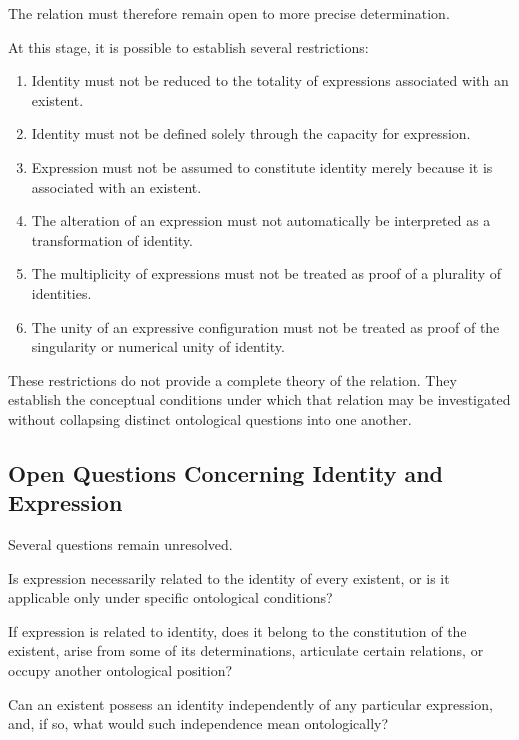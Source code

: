 The relation must therefore remain open to more
precise determination.

At this stage, it is possible to establish several
restrictions:

\begin{enumerate}
    \item Identity must not be reduced to the totality
    of expressions associated with an existent.

    \item Identity must not be defined solely through
    the capacity for expression.

    \item Expression must not be assumed to constitute
    identity merely because it is associated with
    an existent.

    \item The alteration of an expression must not
    automatically be interpreted as a transformation
    of identity.

    \item The multiplicity of expressions must not
    be treated as proof of a plurality of identities.

    \item The unity of an expressive configuration
    must not be treated as proof of the singularity
    or numerical unity of identity.
\end{enumerate}

These restrictions do not provide a complete theory
of the relation. They establish the conceptual
conditions under which that relation may be
investigated without collapsing distinct ontological
questions into one another.

\subsection{Open Questions Concerning Identity and Expression}

Several questions remain unresolved.

Is expression necessarily related to the identity
of every existent, or is it applicable only under
specific ontological conditions?

If expression is related to identity, does it belong
to the constitution of the existent, arise from
some of its determinations, articulate certain
relations, or occupy another ontological position?

Can an existent possess an identity independently
of any particular expression, and, if so, what
would such independence mean ontologically?

